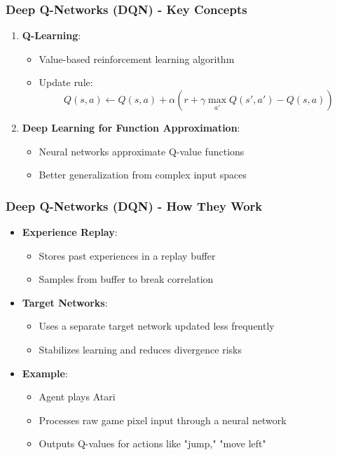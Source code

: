 \documentclass[aspectratio=169]{beamer}
\begin{document}
\begin{frame}[fragile]
    \frametitle{Deep Q-Networks (DQN) - Key Concepts}
    \begin{enumerate}
        \item \textbf{Q-Learning}:
            \begin{itemize}
                \item Value-based reinforcement learning algorithm
                \item Update rule:
                \begin{equation}
                Q(s, a) \leftarrow Q(s, a) + \alpha \left( r + \gamma \max_{a'} Q(s', a') - Q(s, a) \right)
                \end{equation}
            \end{itemize}
        
        \item \textbf{Deep Learning for Function Approximation}:
            \begin{itemize}
                \item Neural networks approximate Q-value functions
                \item Better generalization from complex input spaces
            \end{itemize}
    \end{enumerate}
\end{frame}

\begin{frame}[fragile]
    \frametitle{Deep Q-Networks (DQN) - How They Work}
    \begin{itemize}
        \item \textbf{Experience Replay}:
            \begin{itemize}
                \item Stores past experiences in a replay buffer
                \item Samples from buffer to break correlation
            \end{itemize}
        
        \item \textbf{Target Networks}:
            \begin{itemize}
                \item Uses a separate target network updated less frequently
                \item Stabilizes learning and reduces divergence risks
            \end{itemize}
        
        \item \textbf{Example}:
            \begin{itemize}
                \item Agent plays Atari
                \item Processes raw game pixel input through a neural network
                \item Outputs Q-values for actions like "jump," "move left"
            \end{itemize}
    \end{itemize}
\end{frame}
\end{document}
